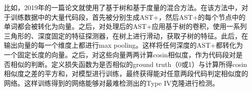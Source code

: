 \documentclass[UTF8]{ctexart}
\begin{document}
比如，2019年的一篇论文\cite{Yu2019}就使用了基于树和基于度量的混合方法。在该方法中，对于训练数据中的大量代码段，首先被分别生成AST+，然后AST+的每个节点中的单词都会被转化为向量。之后，对处理后的AST+应用基于树的卷积，使用一系列三角形的、深度固定的特征探测器，在树上进行滑动，获取子树的特征。此后，在输出向量的每一个维度上都进行max pooling。这样将任何深度的AST+都转化为一个固定长度的向量。之后，对这些向量两两计算cosin相似度，作为代码段对是否相似的判断。定义损失函数为是否相似的ground truth（0或1）与计算所得cosin相似度之差的平方和，对模型进行训练，最终获得能对任意两段代码判定相似度的网络。这样训练得到的网络能够对最难检测出的Type IV克隆进行检测。




\end{document}
